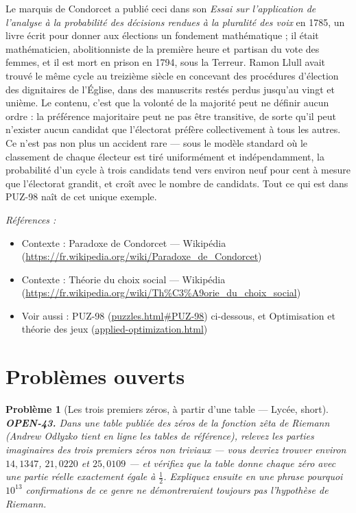 \documentclass[11pt]{article}
\newtheorem{problem}{Problème}
\newenvironment{refs}{\par\small\noindent\emph{Références :}\begin{itemize}\setlength\itemsep{0pt}}{\end{itemize}\normalsize}
\begin{document}
\noindent Le marquis de Condorcet a publié ceci dans son \textit{Essai sur l'application
de l'analyse à la probabilité des décisions rendues à la pluralité des voix} en 1785, un
livre écrit pour donner aux élections un fondement mathématique ; il était mathématicien,
abolitionniste de la première heure et partisan du vote des femmes, et il est mort en prison
en 1794, sous la Terreur. Ramon Llull avait trouvé le même cycle au treizième siècle en
concevant des procédures d'élection des dignitaires de l'Église, dans des manuscrits restés
perdus jusqu'au vingt et unième. Le contenu, c'est que \og{} la volonté de la majorité \fg{} peut ne
définir aucun ordre : la préférence majoritaire peut ne pas être transitive, de sorte qu'il
peut n'exister aucun candidat que l'électorat préfère collectivement à tous les autres. Ce
n'est pas non plus un accident rare --- sous le modèle standard où le classement de chaque
électeur est tiré uniformément et indépendamment, la probabilité d'un cycle à trois candidats
tend vers environ neuf pour cent à mesure que l'électorat grandit, et croît avec le nombre de
candidats. Tout ce qui est dans PUZ-98 naît de cet unique exemple.

\begin{refs}
\item Contexte : Paradoxe de Condorcet --- Wikipédia (\url{https://fr.wikipedia.org/wiki/Paradoxe_de_Condorcet})
\item Contexte : Théorie du choix social --- Wikipédia (\url{https://fr.wikipedia.org/wiki/Th%C3%A9orie_du_choix_social})
\item Voir aussi : PUZ-98 (\url{puzzles.html#PUZ-98}) ci-dessous, et Optimisation et théorie des jeux (\url{applied-optimization.html})
\end{refs}

\bigskip


\section*{Problèmes ouverts}

\begin{problem}[{Les trois premiers zéros, à partir d'une table --- Lycée, short}]
\textbf{OPEN-43.} Dans une table publiée des zéros de la fonction zêta
de Riemann (Andrew Odlyzko tient en ligne les tables de référence), relevez les parties
imaginaires des trois premiers zéros non triviaux --- vous devriez trouver environ
$ 14{,}1347 $, $ 21{,}0220 $ et $ 25{,}0109 $ --- et vérifiez que la table donne
chaque zéro avec une partie réelle exactement égale à $ \tfrac{1}{2} $. Expliquez
ensuite en une phrase pourquoi $ 10^{13} $ confirmations de ce genre ne démontreraient
toujours pas l'hypothèse de Riemann.
\end{problem}
\end{document}
